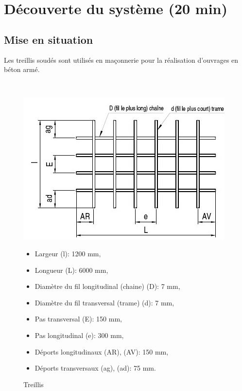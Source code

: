 

\section{Découverte du système (20 min)}

\subsection{Mise en situation}

Les treillis soudés sont utilisés en maçonnerie pour la réalisation d'ouvrages en béton armé.

~\

\begin{figure}[!h]
\centering
\begin{minipage}{0.35\linewidth}
\includegraphics[width=\linewidth]{img/fig1}
\caption{Treillis}
\label{fig1}
\end{minipage}\hfill
\begin{minipage}{0.6\linewidth}
\begin{itemize}
 \item Largeur (l): 1200 mm,
 \item Longueur	(L): 6000 mm,
 \item Diamètre du fil longitudinal (chaine) (D): 7 mm,
 \item Diamètre du fil transversal (trame) (d): 7 mm,
 \item Pas transversal (E): 150 mm,
 \item Pas longitudinal	(e): 300 mm,
 \item Déports longitudinaux (AR), (AV): 150 mm,
 \item Déports transversaux	(ag), (ad): 75 mm.
\end{itemize}
\end{minipage}
\end{figure}

